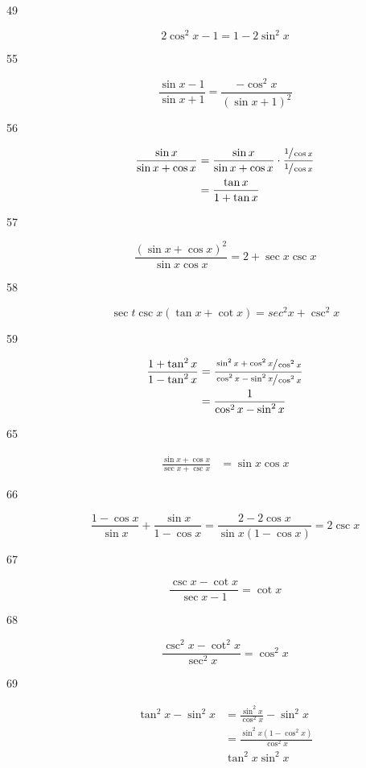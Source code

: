 \documentclass{exam}
\begin{document}
\begin{description}
    \item[49]
      \[
        2 \cos^2 x - 1 = 1 - 2 \sin^2 x
      \]

    \item[55]
      \[
        \frac{\sin x - 1}{\sin x + 1} = \frac{- \cos^2 x}{(\sin x + 1)^2}
      \]

    \item[56]
      \begin{align*}
        \frac{\sin x}{\sin x + \cos x} & = \frac{\sin x}{\sin x + \cos x} \cdot \frac{\sfrac{1}{\cos x}}{\sfrac{1}{\cos x}} \\
                                       & = \frac{\tan x}{1 + \tan x} \\
      \end{align*}

    \item[57]
      \[
        \frac{(\sin x + \cos x)^2}{\sin x \cos x} = 2 + \sec x \csc x
      \]

    \item[58]
      \[
        \sec t \csc x (\tan x + \cot x) = sec^2 x + \csc^2 x
      \]

    \item[59]
      \begin{align*}
        \frac{1 + \tan^2 x}{1 - \tan^2 x} & = \frac{\sfrac{\sin^2 x + \cos^2 x}{\cos^2 x}}{\sfrac{\cos^2 x - \sin^2 x}{\cos^2 x}} \\
                                          & = \frac{1}{\cos^2 x - \sin^2 x} \\
      \end{align*}

    \item[65]
      \begin{align*}
        \frac{\sin x + \cos x}{\sec x + \csc x} & = \sin x \cos x 
      \end{align*}

    \item[66]
      \[
        \frac{1 - \cos x}{\sin x} + \frac{\sin x}{1 - \cos x} = \frac{2 - 2 \cos x}{\sin x(1 - \cos x)} = 2 \csc x
      \]

    \item[67]
      \[
        \frac{\csc x - \cot x}{\sec x - 1} = \cot x
      \]

    \item[68]
      \[
        \frac{\csc^2 x - \cot^2 x}{\sec^2 x} = \cos^2 x
      \]

    \item[69]
      \begin{align*}
        \tan^2 x - \sin^2 x & = \frac{\sin^2 x}{\cos^2 x} - \sin^2 x \\
                            & = \frac{\sin^2 x (1 - \cos^2 x)}{\cos^2 x} \\
                            & \tan^2 x \sin^2 x
      \end{align*}


\end{description}
\end{document}
